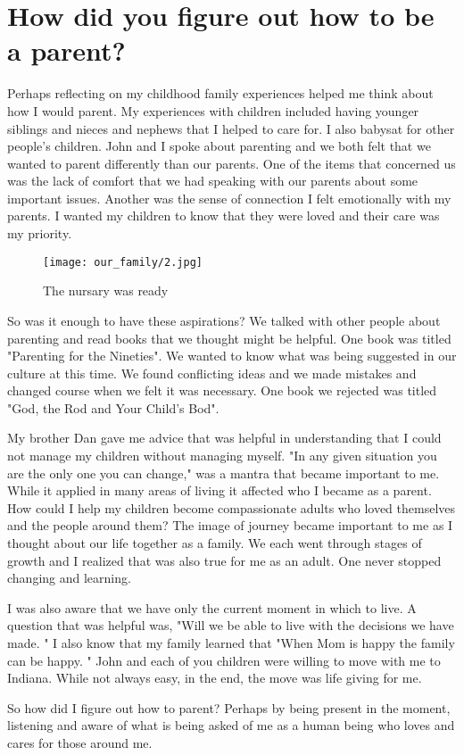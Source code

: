 \section{How did you figure out how to be a parent?}
Perhaps reflecting on my childhood family experiences helped me think about how I would parent.
My experiences with children included having younger siblings and nieces and nephews that I helped to care for.
I also babysat for other people's children.
John and I spoke about parenting and we both felt that we wanted to parent differently than our parents.
One of the items that concerned us was the lack of comfort that we had speaking with our parents about some important issues.
Another was the sense of connection I felt emotionally with my parents.
I wanted my children to know that they were loved and their care was my priority.
\begin{figure}
\centering
\texttt{[image: our\_family/2.jpg]}
\caption{
The nursary was ready
}
\end{figure}

So was it enough to have these aspirations? We talked with other people about parenting and read books that we thought might be helpful.
One book was titled "Parenting for the Nineties".
We wanted to know what was being suggested in our culture at this time.
We found conflicting ideas and we made mistakes and changed course when we felt it was necessary.
One book we rejected was titled "God, the Rod and Your Child's Bod".

My brother Dan gave me advice that was helpful in understanding that I could not manage my children without managing myself.
"In any given situation you are the only one you can change," was a mantra that became important to me.
While it applied in many areas of living it affected who I became as a parent.
How could I help my children become compassionate adults who loved themselves and the people around them?
The image of journey became important to me as I thought about our life together as a family.
We each went through stages of growth and I realized that was also true for me as an adult.
One never stopped changing and learning.

I was also aware that we have only the current moment in which to live.
A question that was helpful was, "Will we be able to live with the decisions we have made.
" I also know that my family learned that "When Mom is happy the family can be happy.
" John and each of you children were willing to move with me to Indiana.
While not always easy, in the end, the move was life giving for me.

So how did I figure out how to parent? Perhaps by being present in the moment, listening and aware of what is being asked of me as a human being who loves and cares for those around me.





